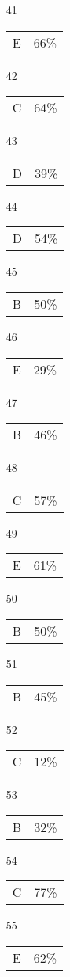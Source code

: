\documentclass[12pt]{article}
\begin{document}
\begin{multicols}{5}
\begin{enumerate}
\item[41] \begin{tabular}{cc} E & 66\%\end{tabular}
\item[42] \begin{tabular}{cc} C & 64\%\end{tabular}
\item[43] \begin{tabular}{cc} D & 39\%\end{tabular}
\item[44] \begin{tabular}{cc} D & 54\%\end{tabular}
\item[45] \begin{tabular}{cc} B & 50\%\end{tabular}
\item[]
\item[46] \begin{tabular}{cc} E & 29\%\end{tabular}
\item[47] \begin{tabular}{cc} B & 46\%\end{tabular}
\item[48] \begin{tabular}{cc} C & 57\%\end{tabular}
\item[49] \begin{tabular}{cc} E & 61\%\end{tabular}
\item[50] \begin{tabular}{cc} B & 50\%\end{tabular}
\item[]
\item[51] \begin{tabular}{cc} B & 45\%\end{tabular}
\item[52] \begin{tabular}{cc} C & 12\%\end{tabular}
\item[53] \begin{tabular}{cc} B & 32\%\end{tabular}
\item[54] \begin{tabular}{cc} C & 77\%\end{tabular}
\item[55] \begin{tabular}{cc} E & 62\%\end{tabular}

\end{enumerate}
\end{multicols}
\end{document}
